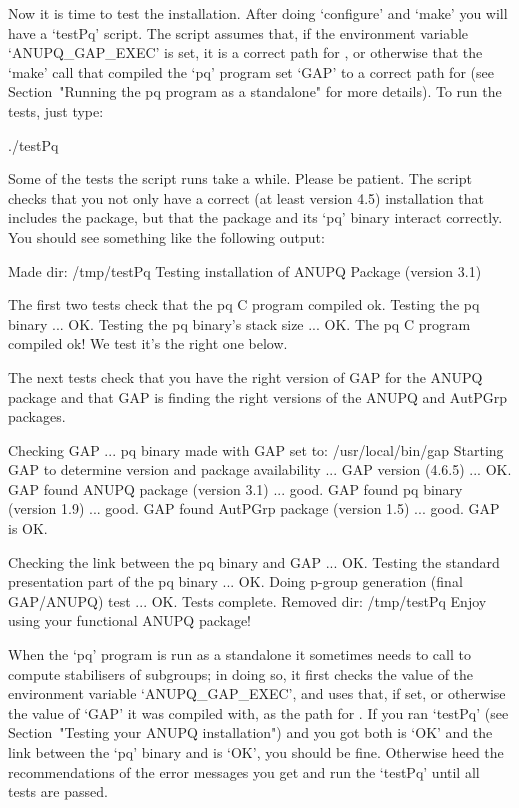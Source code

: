 
Now it is time to test the  installation.  After  doing  `configure'  and
`make' you will have a `testPq' script. The script assumes that,  if  the
environment variable `ANUPQ_GAP_EXEC' is set, it is a  correct  path  for
{\GAP}, or otherwise that the `make' call that compiled the  `pq' program
set `GAP' to a correct path  for  {\GAP}  (see  Section~"Running  the  pq
program as a standalone" for more details). To run the tests, just type:

\begintt
./testPq
\endtt

Some of the tests the script runs take a while. Please  be  patient.  The
script checks that you not only have a correct {\GAP} (at  least  version
4.5) installation that includes the  {\AutPGrp}  package,  but  that  the
{\ANUPQ} package and its `pq' binary interact correctly. You  should  see
something like the following output:

\begintt
Made dir: /tmp/testPq
Testing installation of ANUPQ Package (version 3.1)
 
The first two tests check that the pq C program compiled ok.
Testing the pq binary ... OK.
Testing the pq binary's stack size ... OK.
The pq C program compiled ok! We test it's the right one below.
 
The next tests check that you have the right version of GAP
for the ANUPQ package and that GAP is finding
the right versions of the ANUPQ and AutPGrp packages.
 
Checking GAP ...
 pq binary made with GAP set to: /usr/local/bin/gap
 Starting GAP to determine version and package availability ...
  GAP version (4.6.5) ... OK.
  GAP found ANUPQ package (version 3.1) ... good.
  GAP found pq binary (version 1.9) ... good.
  GAP found AutPGrp package (version 1.5) ... good.
 GAP is OK.
 
Checking the link between the pq binary and GAP ... OK.
Testing the standard presentation part of the pq binary ... OK.
Doing p-group generation (final GAP/ANUPQ) test ... OK.
Tests complete.
Removed dir: /tmp/testPq
Enjoy using your functional ANUPQ package!
\endtt


When the `pq' program is run as a standalone it sometimes  needs  to call
{\GAP} to compute stabilisers of subgroups; in doing so, it first  checks
the value of the environment variable `ANUPQ_GAP_EXEC', and uses that, if
set, or otherwise the value of `GAP' it was compiled with,  as  the  path
for  {\GAP}.  If  you  ran  `testPq'  (see  Section~"Testing  your  ANUPQ
installation") and you got both {\GAP} is `OK' and the link  between  the
`pq' binary and {\GAP} is `OK', you should be fine.  Otherwise  heed  the
recommendations of the error messages you get and run the `testPq'  until
all tests are passed.

